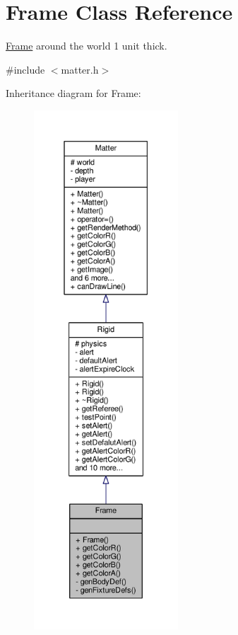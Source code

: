\hypertarget{classFrame}{}\section{Frame Class Reference}
\label{classFrame}


\hyperlink{classFrame}{Frame} around the world 1 unit thick.  




{\ttfamily \#include $<$matter.\+h$>$}



Inheritance diagram for Frame\+:
\nopagebreak
\begin{figure}[H]
\begin{center}
\leavevmode
\includegraphics[height=550pt]{classFrame__inherit__graph}
\end{center}
\end{figure}


